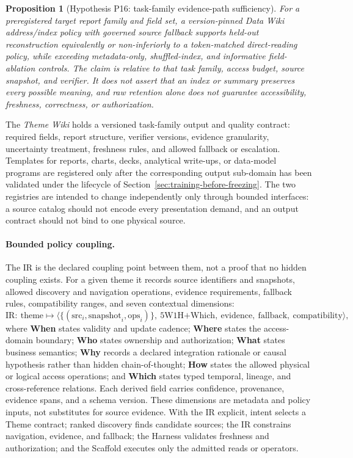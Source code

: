 \documentclass[11pt]{article}
\newtheorem{proposition}{Proposition}
\begin{document}
\begin{proposition}[Hypothesis P16: task-family evidence-path sufficiency]
\label{prop:p16}
For a preregistered target report family and field set, a version-pinned Data Wiki address/index policy with governed source fallback supports held-out reconstruction equivalently or non-inferiorly to a token-matched direct-reading policy, while exceeding metadata-only, shuffled-index, and informative field-ablation controls. The claim is relative to that task family, access budget, source snapshot, and verifier. It does not assert that an index or summary preserves every possible meaning, and raw retention alone does not guarantee accessibility, freshness, correctness, or authorization.
\end{proposition}

The \textit{Theme Wiki} holds a versioned task-family output and quality contract: required fields, report structure, verifier versions, evidence granularity, uncertainty treatment, freshness rules, and allowed fallback or escalation. Templates for reports, charts, decks, analytical write-ups, or data-model programs are registered only after the corresponding output sub-domain has been validated under the lifecycle of Section~\ref{sec:training-before-freezing}. The two registries are intended to change independently only through bounded interfaces: a source catalog should not encode every presentation demand, and an output contract should not bind to one physical source.

\paragraph{Bounded policy coupling.}
The IR is the declared coupling point between them, not a proof that no hidden coupling exists. For a given theme it records source identifiers and snapshots, allowed discovery and navigation operations, evidence requirements, fallback rules, compatibility ranges, and seven contextual dimensions:
\begin{equation}
\mathrm{IR}:\ \mathrm{theme} \mapsto \langle \{(\mathrm{src}_i,\mathrm{snapshot}_i,\mathrm{ops}_i)\},\ \mathrm{5W1H}\mathrm{+}\mathrm{Which},\ \mathrm{evidence},\ \mathrm{fallback},\ \mathrm{compatibility} \rangle,
\end{equation}
where \textbf{When} states validity and update cadence; \textbf{Where} states the access-domain boundary; \textbf{Who} states ownership and authorization; \textbf{What} states business semantics; \textbf{Why} records a declared integration rationale or causal hypothesis rather than hidden chain-of-thought; \textbf{How} states the allowed physical or logical access operations; and \textbf{Which} states typed temporal, lineage, and cross-reference relations. Each derived field carries confidence, provenance, evidence spans, and a schema version. These dimensions are metadata and policy inputs, not substitutes for source evidence. With the IR explicit, intent selects a Theme contract; ranked discovery finds candidate sources; the IR constrains navigation, evidence, and fallback; the Harness validates freshness and authorization; and the Scaffold executes only the admitted reads or operators.
\end{document}
